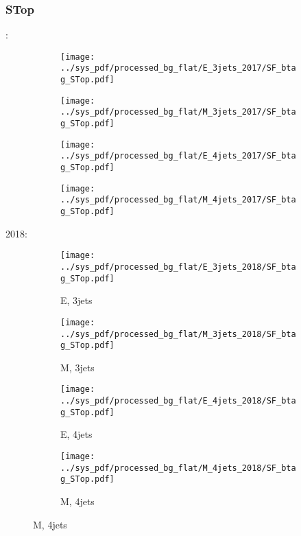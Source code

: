 \documentclass{beamer}
\begin{document}
\begin{frame}
\frametitle{STop}
\fontsize{5}{1}:
\begin{figure}
\centering
\begin{subfigure}[b]{0.24\textwidth}
\texttt{[image: ../sys\_pdf/processed\_bg\_flat/E\_3jets\_2017/SF\_btag\_STop.pdf]}
\end{subfigure}
\begin{subfigure}[b]{0.24\textwidth}
\texttt{[image: ../sys\_pdf/processed\_bg\_flat/M\_3jets\_2017/SF\_btag\_STop.pdf]}
\end{subfigure}
\begin{subfigure}[b]{0.24\textwidth}
\texttt{[image: ../sys\_pdf/processed\_bg\_flat/E\_4jets\_2017/SF\_btag\_STop.pdf]}
\end{subfigure}
\begin{subfigure}[b]{0.24\textwidth}
\texttt{[image: ../sys\_pdf/processed\_bg\_flat/M\_4jets\_2017/SF\_btag\_STop.pdf]}
\end{subfigure}
\end{figure}
2018:
\begin{figure}
\centering
\begin{subfigure}[b]{0.24\textwidth}
\texttt{[image: ../sys\_pdf/processed\_bg\_flat/E\_3jets\_2018/SF\_btag\_STop.pdf]}
\captionsetup{font=tiny}
\caption{E, 3jets}
\end{subfigure}
\begin{subfigure}[b]{0.24\textwidth}
\texttt{[image: ../sys\_pdf/processed\_bg\_flat/M\_3jets\_2018/SF\_btag\_STop.pdf]}
\captionsetup{font=tiny}
\caption{M, 3jets}
\end{subfigure}
\begin{subfigure}[b]{0.24\textwidth}
\texttt{[image: ../sys\_pdf/processed\_bg\_flat/E\_4jets\_2018/SF\_btag\_STop.pdf]}
\captionsetup{font=tiny}
\caption{E, 4jets}
\end{subfigure}
\begin{subfigure}[b]{0.24\textwidth}
\texttt{[image: ../sys\_pdf/processed\_bg\_flat/M\_4jets\_2018/SF\_btag\_STop.pdf]}
\captionsetup{font=tiny}
\caption{M, 4jets}
\end{subfigure}
\end{figure}
\end{frame}
\end{document}
